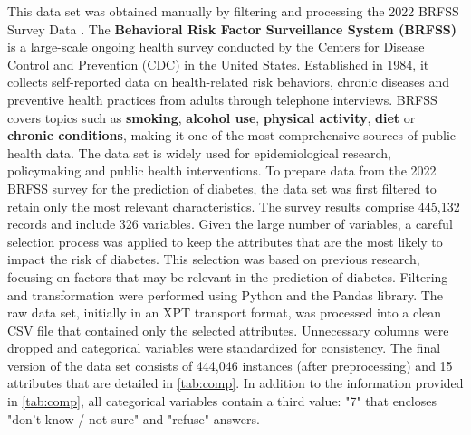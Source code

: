 \documentclass[runningheads]{llncs}
\begin{document}
This data set was obtained manually by filtering and processing the 2022 BRFSS Survey Data \cite{BRFSS2022}. The \textbf{Behavioral Risk Factor Surveillance System (BRFSS)} is a large-scale ongoing health survey conducted by the Centers for Disease Control and Prevention (CDC) in the United States. Established in 1984, it collects self-reported data on health-related risk behaviors, chronic diseases and preventive health practices from adults through telephone interviews. BRFSS covers topics such as \textbf{smoking}, \textbf{alcohol use}, \textbf{physical activity}, \textbf{diet} or \textbf{chronic conditions}, making it one of the most comprehensive sources of public health data. The data set is widely used for epidemiological research, policymaking and public health interventions. 
To prepare data from the 2022 BRFSS survey for the prediction of diabetes, the data set was first filtered to retain only the most relevant characteristics. The survey results comprise 445,132 records and include 326 variables. Given the large number of variables, a careful selection process was applied to keep the attributes that are the most likely to impact the risk of diabetes. This selection was based on previous research, focusing on factors that may be relevant in the prediction of diabetes. 
Filtering and transformation were performed using Python and the Pandas library. The raw data set, initially in an XPT transport format, was processed into a clean CSV file that contained only the selected attributes. Unnecessary columns were dropped and categorical variables were standardized for consistency. The final version of the data set consists of 444,046 instances (after preprocessing) and 15 attributes that are detailed in \autoref{tab:comp}. 
In addition to the information provided in \autoref{tab:comp}, all categorical variables contain a third value: "7" that encloses "don't know / not sure" and "refuse" answers. 
\end{document}
